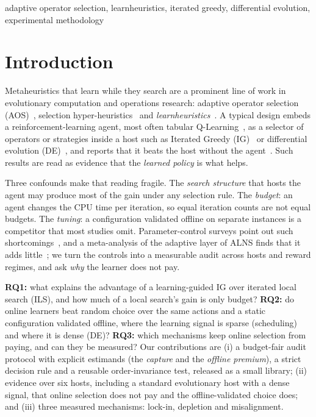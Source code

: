 \documentclass[conference,a4paper]{IEEEtran}
\begin{document}
\begin{IEEEkeywords}
adaptive operator selection, learnheuristics, iterated greedy, differential evolution, experimental methodology
\end{IEEEkeywords}

\section{Introduction}
Metaheuristics that learn while they search are a prominent line of work in evolutionary computation and operations research: adaptive operator selection (AOS)~\cite{FialhoEtal2010,AletiMoser2016}, selection hyper-heuristics~\cite{BurkeEtal2013} and \emph{learnheuristics}~\cite{CalvetEtal2017}.
A typical design embeds a reinforcement-learning agent, most often tabular Q-Learning~\cite{WatkinsDayan1992,SuttonBarto2018}, as a selector of operators or strategies inside a host such as Iterated Greedy (IG)~\cite{RuizStutzle2007} or differential evolution (DE)~\cite{StornPrice1997}, and reports that it beats the host without the agent~\cite{KarimiMamaghanEtal2023,MissaouiOSullivan2026,QinEtal2009}.
Such results are read as evidence that the \emph{learned policy} is what helps.

Three confounds make that reading fragile. The \emph{search structure} that hosts the agent may produce most of the gain under any selection rule.
The \emph{budget}: an agent changes the CPU time per iteration, so equal iteration counts are not equal budgets.
The \emph{tuning}: a configuration validated offline on separate instances is a competitor that most studies omit.
Parameter-control surveys point out such shortcomings~\cite{KarafotiasEtal2015}, and a meta-analysis of the adaptive layer of ALNS finds that it adds little~\cite{TurkesEtal2021}; we turn the controls into a measurable audit across hosts and reward regimes, and ask \emph{why} the learner does not pay.

\textbf{RQ1:} what explains the advantage of a learning-guided IG over iterated local search (ILS), and how much of a local search's gain is only budget?
\textbf{RQ2:} do online learners beat random choice over the same actions and a static configuration validated offline, where the learning signal is sparse (scheduling) and where it is dense (DE)?
\textbf{RQ3:} which mechanisms keep online selection from paying, and can they be measured?
Our contributions are (i) a budget-fair audit protocol with explicit estimands (the \emph{capture} and the \emph{offline premium}), a strict decision rule and a reusable order-invariance test, released as a small library; (ii) evidence over six hosts, including a standard evolutionary host with a dense signal, that online selection does not pay and the offline-validated choice does; and (iii) three measured mechanisms: lock-in, depletion and misalignment.
\end{document}
